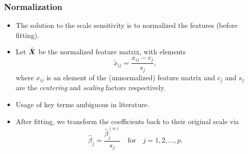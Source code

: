 \documentclass[10pt]{beamer}
\begin{document}
\begin{frame}[c]
  \frametitle{Normalization}

  \begin{itemize}[<+->]
    \item The solution to the scale sensitivity is to normalized the features (before fitting).
    \item Let \(\tilde{\boldsymbol X}\) be the normalized feature matrix, with
          elements
          \[
            \tilde{x}_{ij} = \frac{x_{ij} - c_{j}}{s_j},
          \]
          where \(x_{ij}\) is an element of the (unnormalized) feature matrix
          and \(c_j\) and \(s_j\) are the \emph{centering} and \emph{scaling} factors respectively.
    \item Usage of key terms ambiguous in literature.
    \item After fitting, we transform the coefficients back to their original scale via
          \[
            \hat\beta_j = \frac{\hat\beta^{(n)}_j}{s_j} \quad\text{for}\quad j = 1,2,\dots,p.
          \]


  \end{itemize}

\end{frame}
\end{document}
